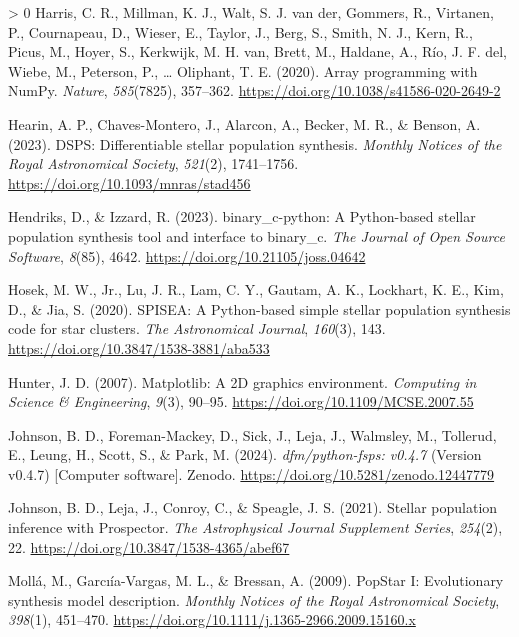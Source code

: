\documentclass[10pt,a4paper,onecolumn]{article}
\newlength{\cslhangindent}
\newenvironment{CSLReferences}[3]%
{%
	\setlength{\parindent}{0pt}
	\ifodd #1 \everypar{\setlength{\hangindent}{\cslhangindent}}\ignorespaces\fi
	\ifnum #2 > 0
	\setlength{\parskip}{#2\baselineskip}
	\fi
}{}
\begin{document}
\begin{CSLReferences}{1}{0}
		\leavevmode\hypertarget{ref-harris2020array}{}%
		Harris, C. R., Millman, K. J., Walt, S. J. van der, Gommers, R.,
		Virtanen, P., Cournapeau, D., Wieser, E., Taylor, J., Berg, S., Smith,
		N. J., Kern, R., Picus, M., Hoyer, S., Kerkwijk, M. H. van, Brett, M.,
		Haldane, A., R\'io, J. F. del, Wiebe, M., Peterson, P., \ldots{} Oliphant,
		T. E. (2020). Array programming with {NumPy}. \emph{Nature},
		\emph{585}(7825), 357--362.
		\url{https://doi.org/10.1038/s41586-020-2649-2}
		
		\leavevmode\hypertarget{ref-hearin+23}{}%
		Hearin, A. P., Chaves-Montero, J., Alarcon, A., Becker, M. R., \&
		Benson, A. (2023). {DSPS: Differentiable stellar population synthesis}.
		\emph{Monthly Notices of the Royal Astronomical Society}, \emph{521}(2),
		1741--1756. \url{https://doi.org/10.1093/mnras/stad456}
		
		\leavevmode\hypertarget{ref-hendriksux5cux26Izzard23}{}%
		Hendriks, D., \& Izzard, R. (2023). {binary\_c-python: A Python-based
			stellar population synthesis tool and interface to binary\_c}. \emph{The
			Journal of Open Source Software}, \emph{8}(85), 4642.
		\url{https://doi.org/10.21105/joss.04642}
		
		\leavevmode\hypertarget{ref-hosek+20}{}%
		Hosek, M. W., Jr., Lu, J. R., Lam, C. Y., Gautam, A. K., Lockhart, K.
		E., Kim, D., \& Jia, S. (2020). {SPISEA}: A {Python}-based simple
		stellar population synthesis code for star clusters. \emph{The
			Astronomical Journal}, \emph{160}(3), 143.
		\url{https://doi.org/10.3847/1538-3881/aba533}
		
		\leavevmode\hypertarget{ref-hunter:2007}{}%
		Hunter, J. D. (2007). Matplotlib: A {2D} graphics environment.
		\emph{Computing in Science \& Engineering}, \emph{9}(3), 90--95.
		\url{https://doi.org/10.1109/MCSE.2007.55}
		
		\leavevmode\hypertarget{ref-jonhson+24}{}%
		Johnson, B. D., Foreman-Mackey, D., Sick, J., Leja, J., Walmsley, M.,
		Tollerud, E., Leung, H., Scott, S., \& Park, M. (2024).
		\emph{{dfm/python-fsps: v0.4.7}} (Version v0.4.7) {[}Computer
		software{]}. Zenodo. \url{https://doi.org/10.5281/zenodo.12447779}
		
		\leavevmode\hypertarget{ref-johnson+21}{}%
		Johnson, B. D., Leja, J., Conroy, C., \& Speagle, J. S. (2021). Stellar
		population inference with {Prospector}. \emph{The Astrophysical Journal
			Supplement Series}, \emph{254}(2), 22.
		\url{https://doi.org/10.3847/1538-4365/abef67}
		
		\leavevmode\hypertarget{ref-molla+09}{}%
		Moll\'a, M., Garcı\'ia-Vargas, M. L., \& Bressan, A. (2009). {PopStar I}:
		Evolutionary synthesis model description. \emph{Monthly Notices of the
			Royal Astronomical Society}, \emph{398}(1), 451--470.
		\url{https://doi.org/10.1111/j.1365-2966.2009.15160.x}
		

\end{CSLReferences}
\end{document}
